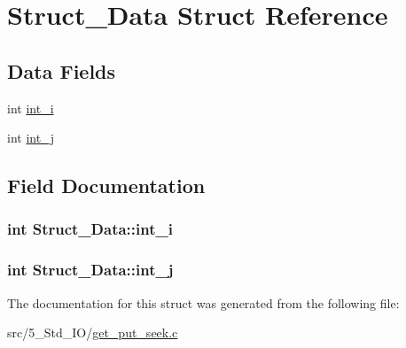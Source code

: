 \hypertarget{struct_struct___data}{}\section{Struct\+\_\+\+Data Struct Reference}
\label{struct_struct___data}
\subsection*{Data Fields}
\begin{DoxyCompactItemize}
\item 
int \hyperlink{struct_struct___data_a4a774193a2142cc94d38d7d65684c421}{int\+\_\+i}
\item 
int \hyperlink{struct_struct___data_ae8f8862229308ad7063bc65293be65e7}{int\+\_\+j}
\end{DoxyCompactItemize}


\subsection{Field Documentation}
\subsubsection[{\texorpdfstring{int\+\_\+i}{int_i}}]{\setlength{\rightskip}{0pt plus 5cm}int Struct\+\_\+\+Data\+::int\+\_\+i}\hypertarget{struct_struct___data_a4a774193a2142cc94d38d7d65684c421}{}\label{struct_struct___data_a4a774193a2142cc94d38d7d65684c421}
\subsubsection[{\texorpdfstring{int\+\_\+j}{int_j}}]{\setlength{\rightskip}{0pt plus 5cm}int Struct\+\_\+\+Data\+::int\+\_\+j}\hypertarget{struct_struct___data_ae8f8862229308ad7063bc65293be65e7}{}\label{struct_struct___data_ae8f8862229308ad7063bc65293be65e7}


The documentation for this struct was generated from the following file\+:\begin{DoxyCompactItemize}
\item 
src/5\+\_\+\+Std\+\_\+\+I\+O/\hyperlink{get__put__seek_8c}{get\+\_\+put\+\_\+seek.\+c}\end{DoxyCompactItemize}
